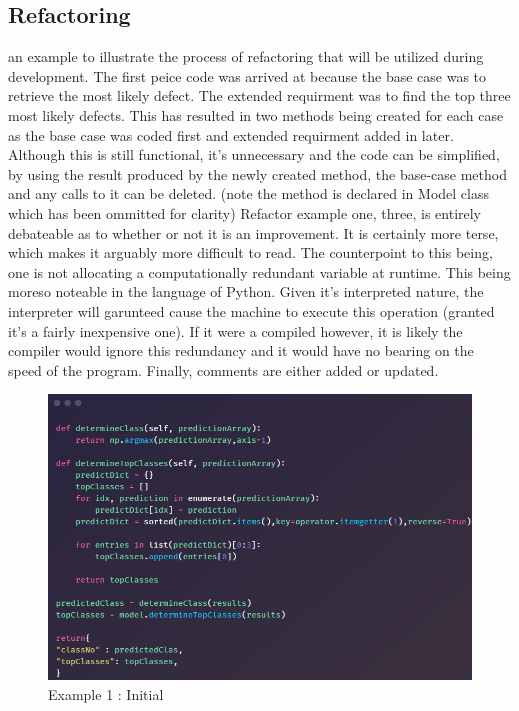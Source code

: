    \subsection{Refactoring}
   an example to illustrate the process of refactoring that will be utilized during development. The first peice code was arrived at because the base case was to retrieve the most likely defect. The extended requirment was to find the top three most likely defects. This has resulted in two methods being created for each case as the base case was coded first and extended requirment added in later. Although this is still functional, it's unnecessary and the code can be simplified, by using the result produced by the newly created method, the base-case method and any calls to it can be deleted. (note the method is declared in Model class which has been ommitted for clarity) Refactor example one, three, is entirely debateable as to whether or not it is an improvement. It is certainly more terse, which makes it arguably more difficult to read. The counterpoint to this being,  one is not allocating a computationally redundant variable at runtime. This being moreso noteable in the language of Python. Given it's interpreted nature, the interpreter will garunteed cause the machine to execute this operation (granted it's a fairly inexpensive one). If it were a compiled however, it is likely the compiler would ignore this redundancy and it would have no bearing on the speed of the program. Finally, comments are either added or updated.

   \begin{figure}[H]
     \begin{center}
       \includegraphics[scale=0.55]{Images/Refactor/refactorA1}
       \caption{Example 1 : Initial}
       \label{fig:refactorA1}
     \end{center}
   \end{figure}

